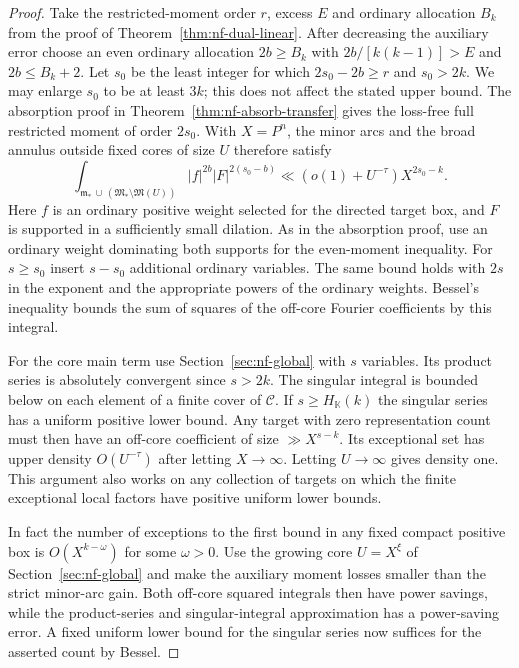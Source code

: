 \documentclass[11pt,letterpaper]{article}
\theoremstyle{definition}
\numberwithin{equation}{section}
\begin{document}
\begin{proof}
Take the restricted-moment order $r$, excess $E$ and ordinary
allocation $B_k$ from the proof of Theorem~\ref{thm:nf-dual-linear}.
After decreasing the auxiliary error choose an even ordinary allocation
$2b\ge B_k$ with $2b/[k(k-1)]>E$ and $2b\le B_k+2$.
Let $s_0$ be the least integer for which $2s_0-2b\ge r$ and
$s_0>2k$. We may enlarge $s_0$ to be at least $3k$; this does not
affect the stated upper bound. The absorption proof in
Theorem~\ref{thm:nf-absorb-transfer} gives the loss-free full
restricted moment of order $2s_0$. With $X=P^n$, the minor arcs and
the broad annulus outside fixed cores of size $U$ therefore satisfy
\[
 \int_{\mathfrak m_*\,\cup\,(\mathfrak M_*\setminus\mathfrak M(U))}
        |f|^{2b}|F|^{2(s_0-b)}
       \ll (o(1)+U^{-\tau})X^{2s_0-k}.
\]
Here $f$ is an ordinary positive weight selected for the directed
target box, and $F$ is supported in a sufficiently small dilation.
As in the absorption proof, use an ordinary weight dominating both
supports for the even-moment inequality. For $s\ge s_0$ insert
$s-s_0$ additional ordinary variables. The same bound holds with
$2s$ in the exponent and the appropriate powers of the ordinary
weights. Bessel's inequality bounds the sum of squares of the
off-core Fourier coefficients by this integral.

For the core main term use Section~\ref{sec:nf-global} with $s$
variables. Its product series is absolutely convergent since
$s>2k$. The singular integral is bounded below on each element
of a finite cover of $\mathcal C$. If $s\ge H_{\mathbb K}(k)$
the singular series has a uniform positive lower bound. Any target
with zero representation count must then have an off-core coefficient
of size $\gg X^{s-k}$. Its exceptional set has upper density
$O(U^{-\tau})$ after letting $X\to\infty$. Letting $U\to\infty$
gives density one. This argument also works on any collection of
targets on which the finite exceptional local factors have positive
uniform lower bounds.

In fact the number of exceptions to the first bound in any fixed
compact positive box is $O(X^{k-\omega})$ for some $\omega>0$.
Use the growing core $U=X^\xi$ of Section~\ref{sec:nf-global} and
make the auxiliary moment losses smaller than the strict minor-arc
gain. Both off-core squared integrals then have power savings, while
the product-series and singular-integral approximation has a
power-saving error. A fixed uniform lower bound for the singular
series now suffices for the asserted count by Bessel.


\end{proof}
\end{document}
